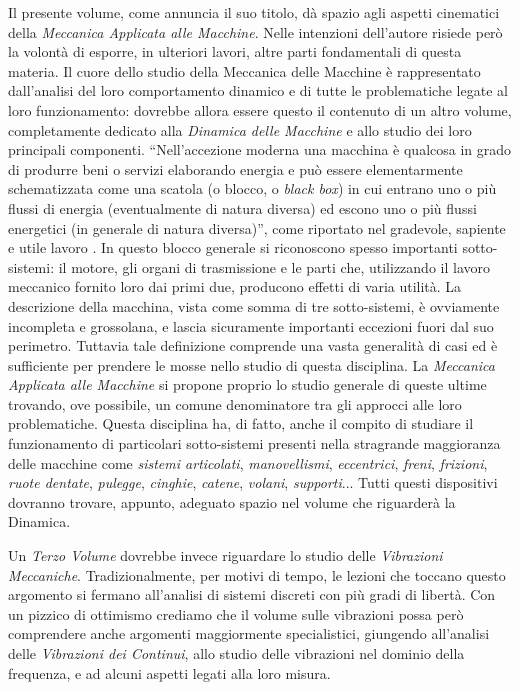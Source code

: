 \noindent 
Il presente volume, come annuncia il suo titolo, d\`a spazio 
agli aspetti cinematici della {\em Meccanica Applicata alle Macchine}. Nelle 
intenzioni dell'autore risiede per\`o la volont\`a di esporre,
in ulteriori lavori,
altre parti fondamentali di questa materia. 
Il cuore dello studio della Meccanica delle Macchine \`e rappresentato
 dall'analisi 
del loro comportamento dinamico e di tutte le problematiche legate al loro
funzionamento: dovrebbe allora essere questo il contenuto di un altro
volume, completamente
dedicato alla {\em Dinamica delle Macchine} e allo studio dei loro
principali componenti.
``Nell'accezione moderna una macchina  \`e qualcosa in
grado di produrre beni o servizi elaborando energia e pu\`o essere elementarmente
schematizzata come una scatola (o blocco, o {\em black box}) in cui entrano uno o
pi\`u flussi di energia (eventualmente di natura diversa) ed escono uno
o pi\`u flussi energetici (in generale di natura diversa)'', come riportato
nel gradevole, sapiente e utile lavoro \cite{giordana}.
In questo blocco generale si riconoscono spesso importanti sotto-sistemi:
il motore, gli organi di
trasmissione e le parti che, utilizzando il lavoro meccanico fornito loro 
dai primi due, producono effetti di varia utilit\`a.
La descrizione della macchina, vista come somma di
tre sotto-sistemi, \`e ovviamente incompleta
e grossolana, e lascia sicuramente importanti eccezioni fuori dal suo perimetro.
Tuttavia tale definizione comprende una vasta generalit\`a di casi ed \`e
sufficiente per prendere
le mosse nello studio di questa disciplina. La {\em Meccanica Applicata alle Macchine}
si propone proprio lo studio generale di queste ultime trovando, ove possibile,
un comune denominatore tra gli approcci alle loro problematiche.
Questa disciplina ha, di fatto, anche il compito di studiare
il funzionamento di particolari sotto-sistemi presenti nella stragrande
maggioranza 
delle macchine come {\em sistemi articolati}, {\em manovellismi},
{\em eccentrici}, {\em freni}, {\em frizioni}, {\em ruote dentate},
{\em pulegge}, {\em cinghie}, {\em catene}, {\em volani}, {\em supporti}...
Tutti questi dispositivi dovranno trovare, appunto, adeguato spazio
nel volume che riguarder\`a la Dinamica.

\noindent Un {\em Terzo Volume} dovrebbe invece
riguardare  lo studio delle  {\em Vibrazioni Meccaniche}.
Tradizionalmente, per motivi di tempo,
le lezioni che toccano questo argomento
si fermano all'analisi di sistemi discreti con pi\`u gradi di libert\`a.
Con un pizzico di ottimismo crediamo che il volume sulle vibrazioni
possa per\`o comprendere anche argomenti maggiormente specialistici,
giungendo all'analisi delle 
{\em Vibrazioni
dei Continui}, allo studio delle vibrazioni nel dominio della frequenza,
e ad alcuni aspetti legati alla loro misura.

